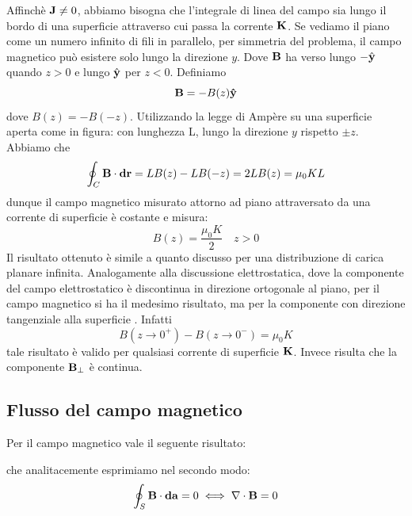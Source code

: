 \noindent Affinch\`e $\bold{J} \neq 0$, abbiamo bisogna che l'integrale di linea del campo sia lungo il bordo di una superficie attraverso cui passa la corrente $\bold{K}$. Se vediamo il piano come un numero infinito di fili in parallelo, per simmetria del problema, il campo magnetico pu\`o esistere solo lungo la direzione $y$. 
Dove $\bold{B}$ ha verso lungo $-\hat{\bold{y}}$ quando $z > 0$ e lungo $\hat{\bold{y}}$ per $z < 0$. Definiamo
\begin{equation*}
	\bold{B} = - B(z) \bold{\hat{y}}
\end{equation*}
dove $B(z)=-B(-z)$. Utilizzando la legge di Amp\`ere su una superficie aperta come in figura:
con lunghezza L, lungo la direzione $y$ rispetto $\pm z$. Abbiamo che 
\begin{equation*}
	\oint_{C} \bold{B} \cdot \bold{dr} = LB(z) -LB(-z) = 2LB(z) = \mu_0 KL
\end{equation*}
dunque il campo magnetico misurato attorno ad piano attraversato da una corrente di superficie \`e costante e misura:
\begin{equation*}
	B(z) = \frac{\mu_0K}{2} \quad z>0
\end{equation*}
Il risultato ottenuto \`e simile a quanto discusso per una distribuzione di carica planare infinita. Analogamente alla discussione elettrostatica, dove la componente del campo elettrostatico \`e discontinua in direzione ortogonale al piano, per il campo magnetico si ha il medesimo risultato, ma per la componente con  direzione tangenziale alla superficie . Infatti
\begin{equation*}
	B(z \to 0^+) - B(z \to 0^-) = \mu_0K
\end{equation*}
tale risultato \`e valido per qualsiasi corrente di superficie $\bold{K}$. Invece risulta che la componente $\bold{B}_{\perp}$ \`e continua.

\subsection{Flusso del campo magnetico}
Per il campo magnetico vale il seguente risultato:
\begin{center}
\end{center}
che analitacemente esprimiamo nel secondo modo:
\begin{equation*}
	\oint_{S} \bold{B} \cdot \bold{da} = 0 \iff \nabla \cdot \bold{B} =0
\end{equation*}

